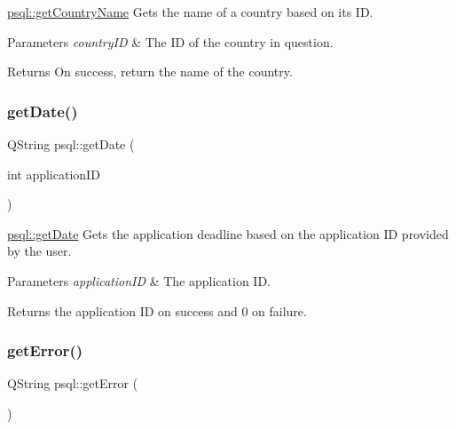 \mbox{\hyperlink{classpsql_a5724e9992e6a5c98524ab73b98f4202d}{psql\+::get\+Country\+Name}} Gets the name of a country based on its ID. 


\begin{DoxyParams}{Parameters}
{\em country\+ID} & The ID of the country in question. \\
\hline
\end{DoxyParams}
\begin{DoxyReturn}{Returns}
On success, return the name of the country. 
\end{DoxyReturn}
\mbox{\label{classpsql_a561f96bfe7e9d092077712dd6b186af8}} 
\subsubsection{\texorpdfstring{getDate()}{getDate()}}
{\footnotesize\ttfamily Q\+String psql\+::get\+Date (\begin{DoxyParamCaption}\item[{int}]{application\+ID }\end{DoxyParamCaption})}



\mbox{\hyperlink{classpsql_a561f96bfe7e9d092077712dd6b186af8}{psql\+::get\+Date}} Gets the application deadline based on the application ID provided by the user. 


\begin{DoxyParams}{Parameters}
{\em application\+ID} & The application ID. \\
\hline
\end{DoxyParams}
\begin{DoxyReturn}{Returns}
the application ID on success and 0 on failure. 
\end{DoxyReturn}
\mbox{\label{classpsql_a5f51e254b67ff932f287df2184ccc043}} 
\subsubsection{\texorpdfstring{getError()}{getError()}}
{\footnotesize\ttfamily Q\+String psql\+::get\+Error (\begin{DoxyParamCaption}{ }\end{DoxyParamCaption})}



